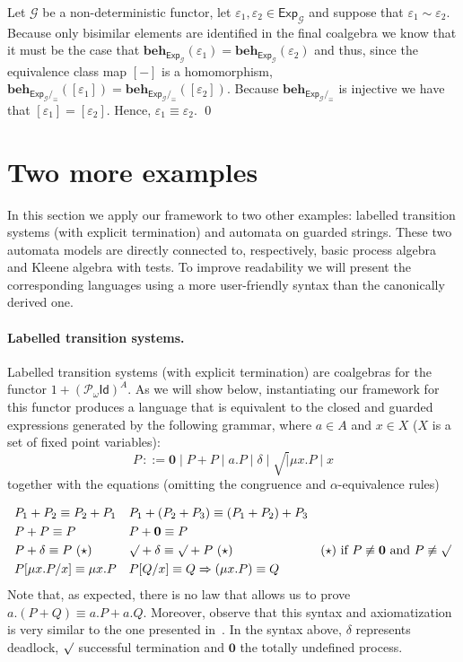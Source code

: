 \documentclass{LMCS}
\def\pow{{\mathcal P_{\!\!\!\omega}}}
\newcommand\E\varepsilon
\newcommand\Exp{\mathsf{Exp}}
\newcommand\id{\mathsf{Id}}
\newcommand\G{\mathcal{G}}
\def\hyph{-\penalty0\hskip0pt\relax}
\theoremstyle{definition}
\theoremstyle{plain}
\theoremstyle{plain}
\theoremstyle{plain}
\theoremstyle{plain}
\theoremstyle{definition}
\theoremstyle{definition}
\begin{document}
\proof 
Let $\G$ be a non\hyph deterministic functor, let $\E_1,\E_2\in \Exp_{\G}$ and suppose that
 $\E_1\sim\E_2$.
Because only bisimilar elements are identified in the final coalgebra
we know that it must be the case that $\mathbf{beh}_{\Exp_\G}(\E_1)
=  \mathbf{beh}_{\Exp_\G}(\E_2) $ and thus, since the equivalence class
map $[-]$ is a homomorphism, $\mathbf{beh}_{\Exp_\G/_{\equiv}}([\E_1])=
\mathbf{beh}_{\Exp_\G/_{\equiv}}([\E_2])$. Because
$\mathbf{beh}_{\Exp_\G/_{\equiv}}$ is injective we have that $[\E_1]=
[\E_2]$. Hence, $\E_1\equiv\E_2$.
\qed

\section{Two more examples}\label{sec:appl}

In this section we apply our framework to two other examples: 
labelled transition systems (with explicit termination) and automata on guarded strings.
These two automata models are directly connected to, respectively, basic process algebra and 
Kleene algebra with tests. To improve readability we will present the corresponding languages 
using a more user-friendly syntax than the canonically derived one.

\paragraph{\textbf{Labelled transition systems.}} Labelled transition systems (with explicit termination) are coalgebras
for the functor $1+(\pow \id)^A$.  As we will show below, instantiating our framework for this functor produces a language that
is equivalent to the closed and guarded expressions generated by the
following grammar, where $a\in A$ and $x\in X$ ($X$ is a set of
fixed point variables):
\[
P\, ::= \mathbf{0} \mid P+P \mid a.P \mid \delta\mid \surd \mid \mu x. P
\mid x
\]
together with the equations (omitting the congruence and $\alpha$-equivalence rules)

\begin{align*}
&P_1 + P_2 \equiv P_2+P_1 && P_1 + (P_2+P_3) \equiv (P_1+P_2)+P_3\\
&P+P  \equiv P &&  P+ \mathbf{0} \equiv P\\
&P+ \delta \equiv P\ (\star)&
&\surd + \delta \equiv \surd + P\ (\star)& (\star) \text{ if }  P\not\equiv
\mathbf{0}\text{ and } P\not\equiv \surd\\
&P[\mu x.P/x] \equiv \mu x . P && P[Q/x]  \equiv  Q \Rightarrow (\mu
x.P)  \equiv Q
\end{align*}
Note that, as expected, there is no law that allows us to prove $a.(P+Q)\equiv a.P+a.Q$. Moreover, 
 observe that this syntax and axiomatization is very similar to the one presented 
in~\cite{AcetoH92}. In the syntax above, $\delta$
represents deadlock, $\surd$ successful termination and $\mathbf 0$
the totally undefined process.
\end{document}
